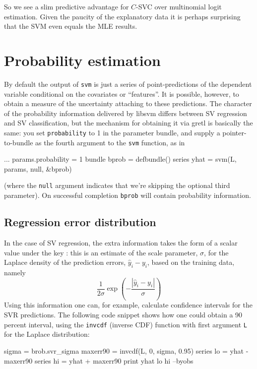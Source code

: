\documentclass{article}
\begin{document}
So we see a slim predictive advantage for $C$-SVC over multinomial
logit estimation. Given the paucity of the explanatory data it is
perhaps surprising that the SVM even equals the MLE results.

\section{Probability estimation}
\label{sec:SV-probs}

By default the output of \texttt{svm} is just a series of
point-predictions of the dependent variable conditional on the
covariates or ``features''. It is possible, however, to obtain a
measure of the uncertainty attaching to these predictions.  The
character of the probability information delivered by \textsf{libsvm}
differs between SV regression and SV classification, but the mechanism
for obtaining it via gretl is basically the same: you set
\texttt{probability} to 1 in the parameter bundle, and supply a
pointer-to-bundle as the fourth argument to the \texttt{svm} function,
as in
\begin{code}
...
params.probability = 1
bundle bprob = defbundle()
series yhat = svm(L, params, null, &bprob)
\end{code}
(where the \texttt{null} argument indicates that we're skipping the
optional third parameter). On successful completion \texttt{bprob}
will contain probability information.

\subsection{Regression error distribution}
\label{sec:SVR-probs}

In the case of SV regression, the extra information takes the
form of a scalar value under the key : this is an
estimate of the scale parameter, $\sigma$, for the Laplace density of
the prediction errors, $\hat{y}_i - y_i$, based on the training data,
namely
\[
\frac{1}{2\sigma} \exp \left(-\frac{|\hat{y}_i - y_i|}{\sigma}\right)
\]
Using this information one can, for example, calculate confidence
intervals for the SVR predictions. The following code snippet shows
how one could obtain a 90 percent interval, using the \texttt{invcdf}
(inverse CDF) function with first argument \texttt{L} for the Laplace
distribution:
\begin{code}
sigma = brob.svr_sigma
maxerr90 = invcdf(L, 0, sigma, 0.95)
series lo = yhat - maxerr90
series hi = yhat + maxerr90
print yhat lo hi --byobs
\end{code}
\end{document}

